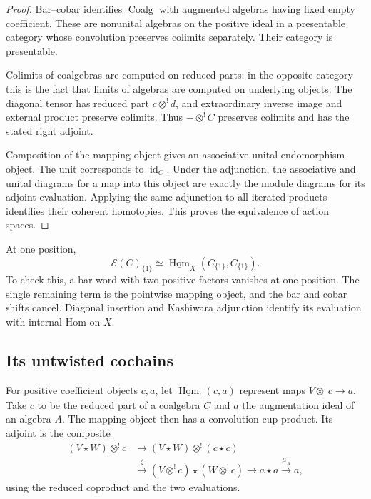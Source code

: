 \begin{proof}
Bar--cobar identifies
$\operatorname{Coalg}$
with augmented algebras
having fixed empty
coefficient. These
are nonunital algebras
on the positive ideal
in a presentable
category whose
convolution preserves
colimits separately.
Their category is
presentable.

Colimits of coalgebras
are computed on reduced
parts: in the opposite
category this is the
fact that limits of
algebras are computed
on underlying objects.
The diagonal tensor
has reduced part
$c\otimes^!d$, and
extraordinary inverse
image and external
product preserve
colimits. Thus
$-\otimes^!C$ preserves
colimits and has the
stated right adjoint.

Composition of the
mapping object gives
an associative unital
endomorphism object.
The unit corresponds
to $\operatorname{id}_C$.
Under the adjunction,
the associative and
unital diagrams for
a map into this
object are exactly
the module diagrams
for its adjoint
evaluation. Applying
the same adjunction
to all iterated
products identifies
their coherent
homotopies. This
proves the equivalence
of action spaces.
\end{proof}

At one position,
\begin{equation}\label{v4-arith:centers:eq:actor-singleton}
 \mathcal E(C)_{\{1\}}
 \simeq
 \underline{\operatorname{Hom}}_X
       (C_{\{1\}},C_{\{1\}}).
\end{equation}
To check this, a
bar word with two
positive factors
vanishes at one
position. The
single remaining
term is the
pointwise mapping
object, and the
bar and cobar
shifts cancel.
Diagonal insertion
and Kashiwara
adjunction identify
its evaluation
with internal Hom
on $X$.

\subsection{Its untwisted cochains}
\label{v4-arith:centers:subsec:pointwise-cochains}

For positive coefficient
objects $c,a$, let
$\underline{\operatorname{Hom}}_!(c,a)$
represent maps
$V\otimes^!c\to a$.
Take $c$ to be the reduced part of a coalgebra $C$
and $a$ the augmentation ideal of an algebra $A$.
The mapping object then has a convolution cup product.
Its adjoint is
the composite
\[
\begin{split}
 (V\star W)\otimes^!c
 &\longrightarrow
 (V\star W)\otimes^!(c\star c)\\
 &\xrightarrow{\zeta}
 (V\otimes^!c)\star(W\otimes^!c)
 \longrightarrow a\star a
 \xrightarrow{\mu_A}a,
\end{split}
\]
using the reduced
coproduct and
the two evaluations.

